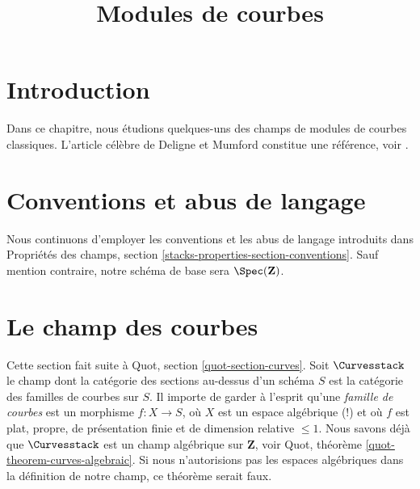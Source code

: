 

%


\title{Modules de courbes}

\maketitle

\label{section-phantom}

\tableofcontents




\section{Introduction}
\label{section-introduction}

\noindent
Dans ce chapitre, nous étudions quelques-uns des champs de modules de courbes
classiques. L'article célèbre de Deligne et Mumford constitue une référence,
voir \cite{DM}.




\section{Conventions et abus de langage}
\label{section-conventions}

\noindent
Nous continuons d'employer les conventions et les abus de langage
introduits dans Propriétés des champs, section
\ref{stacks-properties-section-conventions}.
Sauf mention contraire, notre schéma de base sera $\Spec(\mathbf{Z})$.







\section{Le champ des courbes}
\label{section-stack-curves}

\noindent
Cette section fait suite à Quot, section \ref{quot-section-curves}.
Soit $\Curvesstack$ le champ dont la catégorie des sections au-dessus d'un
schéma $S$ est la catégorie des familles de courbes sur $S$.
Il importe de garder à l'esprit qu'une
{\it famille de courbes} est un morphisme $f : X \to S$, où $X$
est un espace algébrique (!) et où $f$ est plat, propre, de présentation finie
et de dimension relative $\leq 1$.
Nous savons déjà que $\Curvesstack$ est un
champ algébrique sur $\mathbf{Z}$, voir Quot, théorème
\ref{quot-theorem-curves-algebraic}.
Si nous n'autorisions pas les espaces algébriques dans la définition de
notre champ, ce théorème serait faux.

